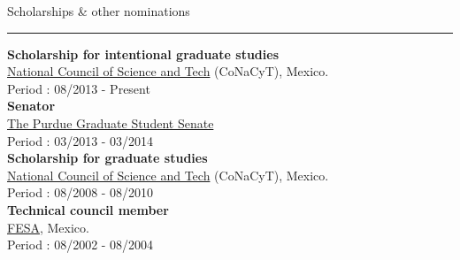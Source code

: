 \documentclass[letterpaper,10pt]{article}
\begin{document}
\begin{minipage}{0.4\textwidth} 
\vspace*{0.5cm}
{\centering \large{Scholarships \& other nominations}} \\
\textcolor{Dandelion}{\rule{0.95\textwidth}{0.05in}}

\textbf{Scholarship for intentional graduate studies} \\
\href{http://www.conacyt.gob.mx}{National Council of Science and Tech} (CoNaCyT),
Mexico. \\
Period : 08/2013 - Present \\

\textbf{Senator} \\
\href{http://web.ics.purdue.edu/~pgsg/}{The Purdue Graduate Student Senate} \\
Period : 03/2013 - 03/2014 \\

\textbf{Scholarship for graduate studies} \\
\href{http://www.conacyt.gob.mx}{National Council of Science and Tech} (CoNaCyT),
Mexico. \\
Period : 08/2008 - 08/2010 \\

\textbf{Technical council member} \\
\href{http://consejotecnico.acatlan.unam.mx/}{FESA},
Mexico. \\
Period : 08/2002 - 08/2004
\end{minipage} 



\end{document}
